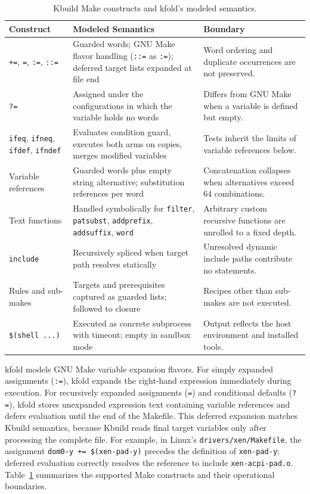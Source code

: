 \documentclass[acmsmall]{acmart}
\newcommand{\tool}{\textsf{kfold}\xspace}
\begin{document}
\begin{table}[t]
\centering\footnotesize
\caption{Kbuild Make constructs and \tool's modeled semantics.}
\label{tab:make-scope}
\begin{tabular}{p{28mm}p{48mm}p{48mm}}
\toprule
Construct & Modeled Semantics & Boundary \\
\midrule
\texttt{+=}, \texttt{=}, \texttt{:=}, \texttt{::=} & Guarded words; GNU Make flavor handling (\texttt{::=} as \texttt{:=}); deferred target lists expanded at file end & Word ordering and duplicate occurrences are not preserved. \\
\texttt{?=} & Assigned under the configurations in which the variable holds no words & Differs from GNU Make when a variable is defined but empty. \\
\texttt{ifeq}, \texttt{ifneq}, \texttt{ifdef}, \texttt{ifndef} & Evaluates condition guard, executes both arms on copies, merges modified variables & Tests inherit the limits of variable references below. \\
Variable references & Guarded words plus empty string alternative; substitution references per word & Concatenation collapses when alternatives exceed 64 combinations. \\
Text functions & Handled symbolically for \texttt{filter}, \texttt{patsubst}, \texttt{addprefix}, \texttt{addsuffix}, \texttt{word} & Arbitrary custom recursive functions are unrolled to a fixed depth. \\
\texttt{include} & Recursively spliced when target path resolves statically & Unresolved dynamic include paths contribute no statements. \\
Rules and sub-makes & Targets and prerequisites captured as guarded lists; followed to closure & Recipes other than sub-makes are not executed. \\
\texttt{\$(shell ...)} & Executed as concrete subprocess with timeout; empty in sandbox mode & Output reflects the host environment and installed tools. \\
\bottomrule
\end{tabular}
\end{table}

\tool models GNU Make variable expansion flavors.
For simply expanded assignments (\texttt{:=}), \tool expands the right-hand expression immediately during execution.
For recursively expanded assignments (\texttt{=}) and conditional defaults (\texttt{?=}), \tool stores unexpanded expression text containing variable references and defers evaluation until the end of the Makefile.
This deferred expansion matches Kbuild semantics, because Kbuild reads final target variables only after processing the complete file.
For example, in Linux's \texttt{drivers/xen/Makefile}, the assignment \texttt{dom0-y += \$(xen-pad-y)} precedes the definition of \texttt{xen-pad-y}; deferred evaluation correctly resolves the reference to include \texttt{xen-acpi-pad.o}.
Table~\ref{tab:make-scope} summarizes the supported Make constructs and their operational boundaries.
\end{document}
